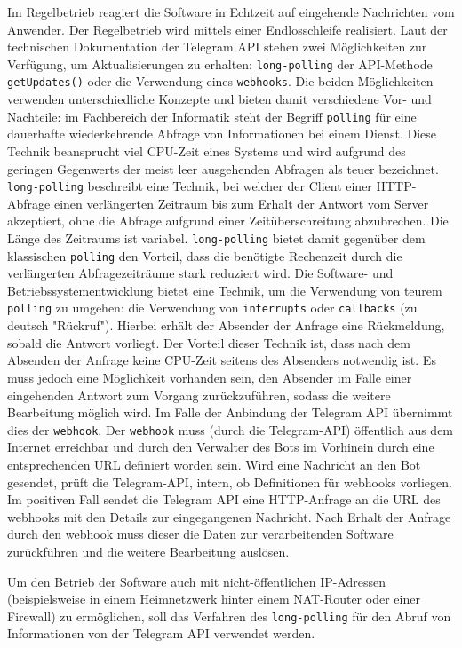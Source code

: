 Im Regelbetrieb reagiert die Software in Echtzeit auf eingehende Nachrichten vom Anwender. Der Regelbetrieb wird mittels einer Endlosschleife realisiert. Laut der technischen Dokumentation der Telegram API \cite{telegram-getting-updates} stehen zwei Möglichkeiten zur Verfügung, um Aktualisierungen zu erhalten: \lstinline{long-polling} der API-Methode \lstinline{getUpdates()} oder die Verwendung eines \lstinline{webhooks}. Die beiden Möglichkeiten verwenden unterschiedliche Konzepte und bieten damit verschiedene Vor- und Nachteile: im Fachbereich der Informatik steht der Begriff \lstinline{polling} für eine dauerhafte wiederkehrende Abfrage von Informationen bei einem Dienst. Diese Technik beansprucht viel CPU-Zeit eines Systems und wird aufgrund des geringen Gegenwerts der meist leer ausgehenden Abfragen als teuer bezeichnet. \lstinline{long-polling} beschreibt eine Technik, bei welcher der Client einer HTTP-Abfrage einen verlängerten Zeitraum bis zum Erhalt der Antwort vom Server akzeptiert, ohne die Abfrage aufgrund einer Zeitüberschreitung abzubrechen. Die Länge des Zeitraums ist variabel. \lstinline{long-polling} bietet damit gegenüber dem klassischen \lstinline{polling} den Vorteil, dass die benötigte Rechenzeit durch die verlängerten Abfragezeiträume stark reduziert wird. Die Software- und Betriebssystementwicklung bietet eine Technik, um die Verwendung von teurem \lstinline{polling} zu umgehen: die Verwendung von \lstinline{interrupts} oder \lstinline{callbacks} (zu deutsch "Rückruf"). Hierbei erhält der Absender der Anfrage eine Rückmeldung, sobald die Antwort vorliegt. Der Vorteil dieser Technik ist, dass nach dem Absenden der Anfrage keine CPU-Zeit seitens des Absenders notwendig ist. Es muss jedoch eine Möglichkeit vorhanden sein, den Absender im Falle einer eingehenden Antwort zum Vorgang zurückzuführen, sodass die weitere Bearbeitung möglich wird. Im Falle der Anbindung der Telegram API übernimmt dies der \lstinline{webhook}. Der \lstinline{webhook} muss (durch die Telegram-API) öffentlich aus dem Internet erreichbar und durch den Verwalter des Bots im Vorhinein durch eine entsprechenden URL definiert worden sein. Wird eine Nachricht an den Bot gesendet, prüft die Telegram-API, intern, ob Definitionen für webhooks vorliegen. Im positiven Fall sendet die Telegram API eine HTTP-Anfrage an die URL des webhooks mit den Details zur eingegangenen Nachricht. Nach Erhalt der Anfrage durch den webhook muss dieser die Daten zur verarbeitenden Software zurückführen und die weitere Bearbeitung auslösen.

Um den Betrieb der Software auch mit nicht-öffentlichen IP-Adressen (beispielsweise in einem Heimnetzwerk hinter einem NAT-Router oder einer Firewall) zu ermöglichen, soll das Verfahren des \lstinline{long-polling} für den Abruf von Informationen von der Telegram API verwendet werden.
